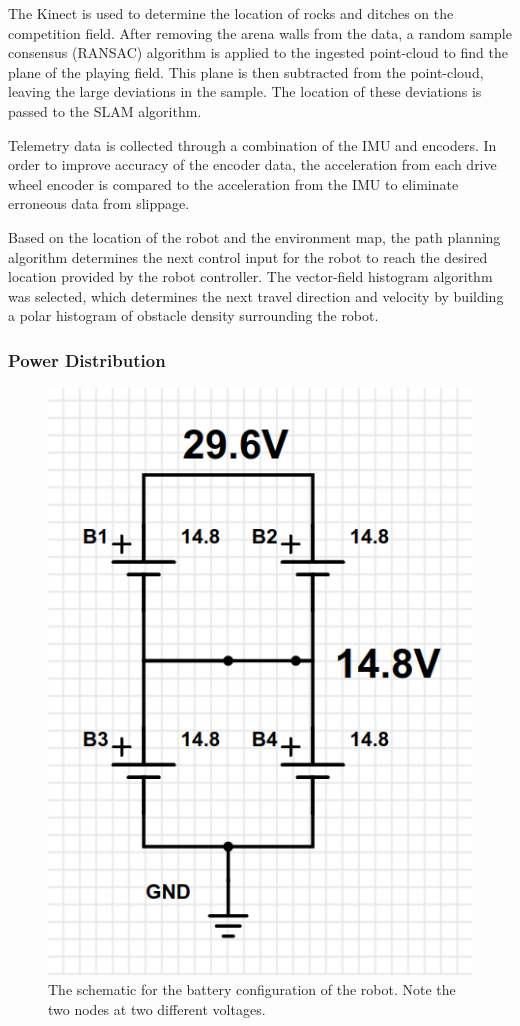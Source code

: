\documentclass[class=article, crop=false]{standalone}
\begin{document}
	The Kinect is used to determine the location of rocks and ditches on the competition field. After removing the arena walls from the data, a random sample consensus (RANSAC) algorithm is applied to the ingested point-cloud to find the plane of the playing field. This plane is then subtracted from the point-cloud, leaving the large deviations in the sample. The location of these deviations is passed to the SLAM algorithm.

	Telemetry data is collected through a combination of the IMU and encoders. In order to improve accuracy of the encoder data, the acceleration from each drive wheel encoder is compared to the acceleration from the IMU to eliminate erroneous data from slippage.
	
	Based on the location of the robot and the environment map, the path planning algorithm determines the next control input for the robot to reach the desired location provided by the robot controller. The vector-field histogram algorithm was selected, which determines the next travel direction and velocity by building a polar histogram of obstacle density surrounding the robot.

	
	\subsubsection{Power Distribution}
	\FloatBarrier
	\begin{figure}
	\centering
	 \includegraphics[width=0.8\linewidth]{09_Figures/power-config.jpg}
	 \caption{The schematic for the battery configuration of the robot. Note the two nodes at two different voltages.}
	 \label{fig:power-config}
	\end{figure}
	\FloatBarrier
	
\end{document}

